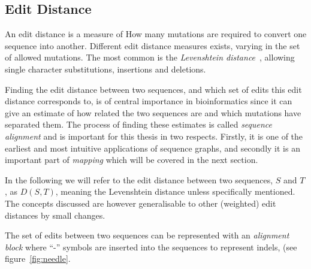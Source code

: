 \subsection{Edit Distance}
An edit distance is a measure of How many mutations are required to convert one sequence into  another. Different edit distance measures exists, varying in the set of allowed mutations. The most common is the \emph{Levenshtein distance}~\cite{levensthein}, allowing single character substitutions, insertions and deletions. 

Finding the edit distance between two sequences, and which set of edits this edit distance corresponds to, is of central importance in bioinformatics since it can give an estimate of how related the two sequences are and which mutations have separated them.
The process of finding these estimates is called \emph{sequence alignment} and is important for this thesis in two respects. Firstly, it is one of the earliest and most intuitive applications of sequence graphs, and secondly it is an important part of \emph{mapping} which will be covered in the next section. 

In the following we will refer to the edit distance between two sequences, $S$ and $T$, as $D(S, T)$, meaning the Levenshtein distance unless specifically mentioned. The concepts discussed are however generalisable to other (weighted) edit distances by small changes.

The set of edits between two sequences can be represented with an \emph{alignment block} where ``-'' symbols are inserted into the sequences to represent indels, (see figure~\ref{fig:needle}.

